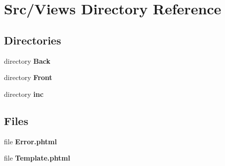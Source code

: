 \section{Src/\+Views Directory Reference}
\label{dir_fa03d2c194b50d62be43f8dfd73ee9cf}
\subsection*{Directories}
\begin{DoxyCompactItemize}
\item 
directory \textbf{ Back}
\item 
directory \textbf{ Front}
\item 
directory \textbf{ inc}
\end{DoxyCompactItemize}
\subsection*{Files}
\begin{DoxyCompactItemize}
\item 
file \textbf{ Error.\+phtml}
\item 
file \textbf{ Template.\+phtml}
\end{DoxyCompactItemize}
